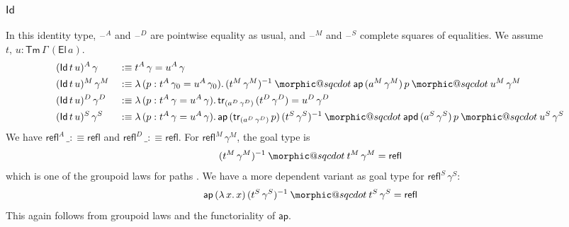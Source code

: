 \documentclass[12pt,a4paper,twoside,openany]{book}
\makeatletter
\DeclareRobustCommand{\sqcdot}{\mathbin{\mathpalette\morphic@sqcdot\relax}}
\newcommand{\morphic@sqcdot}[2]{%
  \sbox\z@{$\m@th#1\centerdot$}%
  \ht\z@=.33333\ht\z@
  \vcenter{\box\z@}%
}
\theoremstyle{remark}
\theoremstyle{definition}
\theoremstyle{theorem}
\newcommand{\ms}[1]{\mathsf{#1}}
\newcommand{\bs}[1]{\boldsymbol{#1}}
\newcommand{\ap}{\ms{ap}}
\newcommand{\apd}{\ms{apd}}
\newcommand{\tr}{\ms{tr}}
\newcommand{\refl}{\mathsf{refl}}
\newcommand{\Tm}{\mathsf{Tm}}
\newcommand{\El}{\mathsf{El}}
\newcommand{\Id}{\mathsf{Id}}
\newcommand{\blank}{\mathord{\hspace{1pt}\text{--}\hspace{1pt}}}
\newcommand{\defn}{:\equiv}
\makeatother
\begin{document}
\subsubsection{$\bs{\Id}$}

In this identity type, $\blank^A$ and $\blank^D$ are pointwise equality as
usual, and $\blank^M$ and $\blank^S$ complete squares of equalities. We assume
$t,\,u : \Tm\,\Gamma\,(\El\,a)$.
\begin{alignat*}{3}
  & (\Id\,t\,u)^A\,\gamma   &&\defn t^A\,\gamma = u^A\,\gamma\\
  & (\Id\,t\,u)^M\,\gamma^M &&\defn \lambda\,(p : t^A\,\gamma_0 = u^A\,\gamma_0).\,(t^M\,\gamma^M)^{-1} \sqcdot \ap\,(a^M\,\gamma^M)\,p \sqcdot u^M\,\gamma^M\\
  & (\Id\,t\,u)^D\,\gamma^D &&\defn \lambda\,(p : t^A\,\gamma = u^A\,\gamma).\,\tr_{(a^D\,\gamma^D)}\,(t^D\,\gamma^D) = u^D\,\gamma^D\\
  & (\Id\,t\,u)^S\,\gamma^S &&\defn \lambda\,(p : t^A\,\gamma = u^A\,\gamma).\,\ap\,(\tr_{(a^D\,\gamma^D)}\,p)\,(t^S\,\gamma^S)^{-1} \sqcdot \apd\,(a^S\,\gamma^S)\,p \sqcdot u^S\,\gamma^S
\end{alignat*}
We have $\refl^A\,\_ \defn \refl$ and $\refl^D\,\_ \defn \refl$. For $\refl^M\,\gamma^M$, the goal type is
\[
  (t^M\,\gamma^M)^{-1} \sqcdot t^M\,\gamma^M = \refl
\]
which is one of the groupoid laws for paths \cite[Section~2.1]{hottbook}. We
have a more dependent variant as goal type for $\refl^S\,\gamma^S$:
\[
  \ap\,(\lambda\,x.\,x)\,(t^S\,\gamma^S)^{-1} \sqcdot t^S\,\gamma^S = \refl
  \]
This again follows from groupoid laws and the functoriality of $\ap$.
\end{document}
